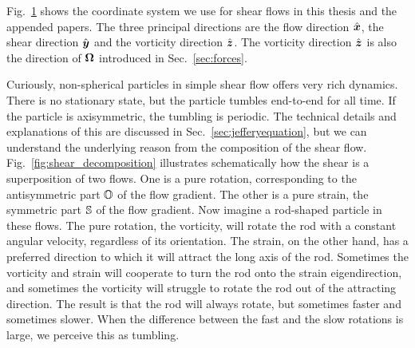 \documentclass[thesis.tex]{subfiles}
\begin{document}
Fig.~\ref{fig:coordinates} shows the coordinate system we use for shear flows in this thesis and the appended papers. The three principal directions are the flow direction $\hat{\mbox{\boldmath$x$}}$, the shear direction $\hat{\mbox{\boldmath$y$}}$ and the vorticity direction $\hat{\mbox{\boldmath$z$}}$. The vorticity direction $\hat{\mbox{\boldmath$z$}}$ is also the direction of $\mbox{\boldmath$\Omega$}$ introduced in Sec.~\ref{sec:forces}.

Curiously, non-spherical particles in simple shear flow offers very rich dynamics. There is no stationary state, but the particle tumbles end-to-end for all time. If the particle is axisymmetric, the tumbling is periodic. The technical details and explanations of this are discussed in Sec.~\ref{sec:jefferyequation}, but we can understand the underlying reason from the composition of the shear flow. Fig.~\ref{fig:shear_decomposition} illustrates schematically how the shear is a superposition of two flows. One is a pure rotation, corresponding to the antisymmetric part $\mathbb{O}$ of the flow gradient. The other is a pure strain, the symmetric part $\mathbb{S}$ of the flow gradient. Now imagine a rod-shaped particle in these flows. The pure rotation, the vorticity, will rotate the rod with a constant angular velocity, regardless of its orientation. The strain, on the other hand, has a preferred direction to which it will attract the long axis of the rod. Sometimes the vorticity and strain will cooperate to turn the rod onto the strain eigendirection, and sometimes the vorticity will struggle to rotate the rod out of the attracting direction. The result is that the rod will always rotate, but sometimes faster and sometimes slower. When the difference between the fast and the slow rotations is large, we perceive this as tumbling.
\begin{figure}
\begin{center}
\end{center}
\caption{\label{fig:coordinates} }%
\end{figure}
\end{document}
